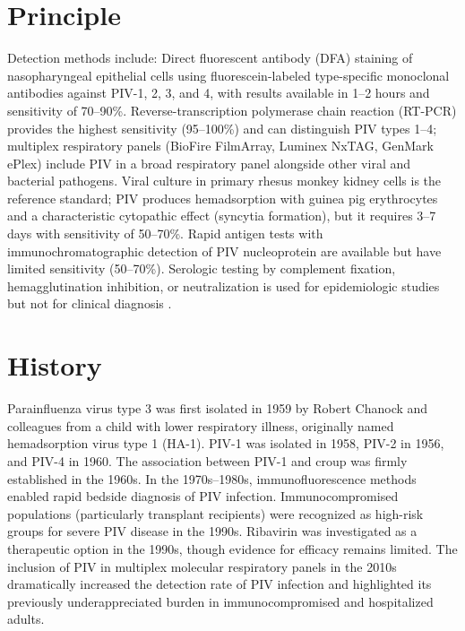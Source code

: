 \section*{Principle}
Detection methods include: Direct fluorescent antibody (DFA) staining of nasopharyngeal epithelial cells using fluorescein-labeled type-specific monoclonal antibodies against PIV-1, 2, 3, and 4, with results available in 1--2 hours and sensitivity of 70--90\%. Reverse-transcription polymerase chain reaction (RT-PCR) provides the highest sensitivity (95--100\%) and can distinguish PIV types 1--4; multiplex respiratory panels (BioFire FilmArray, Luminex NxTAG, GenMark ePlex) include PIV in a broad respiratory panel alongside other viral and bacterial pathogens. Viral culture in primary rhesus monkey kidney cells is the reference standard; PIV produces hemadsorption with guinea pig erythrocytes and a characteristic cytopathic effect (syncytia formation), but it requires 3--7 days with sensitivity of 50--70\%. Rapid antigen tests with immunochromatographic detection of PIV nucleoprotein are available but have limited sensitivity (50--70\%). Serologic testing by complement fixation, hemagglutination inhibition, or neutralization is used for epidemiologic studies but not for clinical diagnosis \cite{henrickson2003parainfluenza}.

\section*{History}
Parainfluenza virus type 3 was first isolated in 1959 by Robert Chanock and colleagues from a child with lower respiratory illness, originally named hemadsorption virus type 1 (HA-1). PIV-1 was isolated in 1958, PIV-2 in 1956, and PIV-4 in 1960. The association between PIV-1 and croup was firmly established in the 1960s. In the 1970s--1980s, immunofluorescence methods enabled rapid bedside diagnosis of PIV infection. Immunocompromised populations (particularly transplant recipients) were recognized as high-risk groups for severe PIV disease in the 1990s. Ribavirin was investigated as a therapeutic option in the 1990s, though evidence for efficacy remains limited. The inclusion of PIV in multiplex molecular respiratory panels in the 2010s dramatically increased the detection rate of PIV infection and highlighted its previously underappreciated burden in immunocompromised and hospitalized adults.

